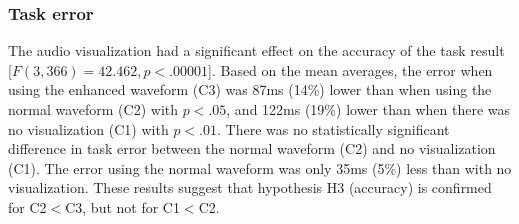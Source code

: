 \subsubsection{Task error}
The audio visualization had a significant effect on the accuracy of the task result [$F(3,366)=42.462, p<.00001$].
Based on the mean averages, the error when using the enhanced waveform (C3) was 87ms (14\%) lower than when using the
normal waveform (C2) with $p<.05$, and 122ms (19\%) lower than when there was no visualization (C1) with $p<.01$. There
was no statistically significant difference in task error between the normal waveform (C2) and no visualization (C1).
The error using the normal waveform was only 35ms (5\%) less than with no visualization.  These results suggest that
hypothesis H3 (accuracy) is confirmed for C2$<$C3, but not for C1$<$C2.




